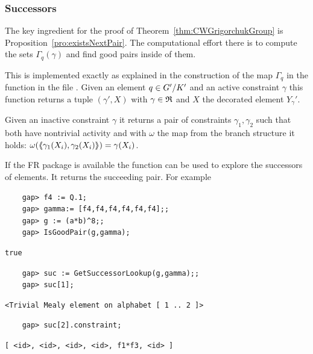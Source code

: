 \documentclass[a4paper,11pt]{amsart}
\begin{document}
\subsubsection{Successors}
The key ingredient for the proof of Theorem~\ref{thm:CWGrigorchukGroup} is
Proposition~\ref{pro:existsNextPair}. The computational effort there is
to compute the sets $\Gamma_q(\gamma)$ and find good pairs inside of them.

This is implemented exactly as explained in the construction of the map
$\Gamma_q$ in the function  in the file 
. Given an element $q\in{G'/K'}$ 
and an active constraint $\gamma$ this function returns a tuple $(\gamma',X)$ 
with $\gamma\in\mathfrak{R}$ and $X$ the decorated element $Y_\gamma'$.

Given an inactive constraint $\gamma$ it returns a pair of constraints
$\gamma_1,\gamma_2$ such that both have nontrivial activity and with
$\omega$ the map from the branch structure it holds:
$\omega(\langle\negthickspace\langle\gamma_1(X_i),\gamma_2(X_i)\rangle\negthickspace\rangle)=\gamma(X_i)$. 

If the FR package is available
the function  can be used to explore the
successors of elements. It returns the succeeding pair. For example
 \begin{lstlisting}
    gap> f4 := Q.1;
    gap> gamma:= [f4,f4,f4,f4,f4,f4];;
    gap> g := (a*b)^8;;
    gap> IsGoodPair(g,gamma);
\end{lstlisting}
\begin{verbatim}
true
\end{verbatim} 
\begin{lstlisting}
    gap> suc := GetSuccessorLookup(g,gamma);;    
    gap> suc[1];
\end{lstlisting}
\begin{verbatim}
<Trivial Mealy element on alphabet [ 1 .. 2 ]>
\end{verbatim} 
\begin{lstlisting}
    gap> suc[2].constraint;
\end{lstlisting}
\begin{verbatim}
[ <id>, <id>, <id>, <id>, f1*f3, <id> ]
\end{verbatim} 



\end{document}
